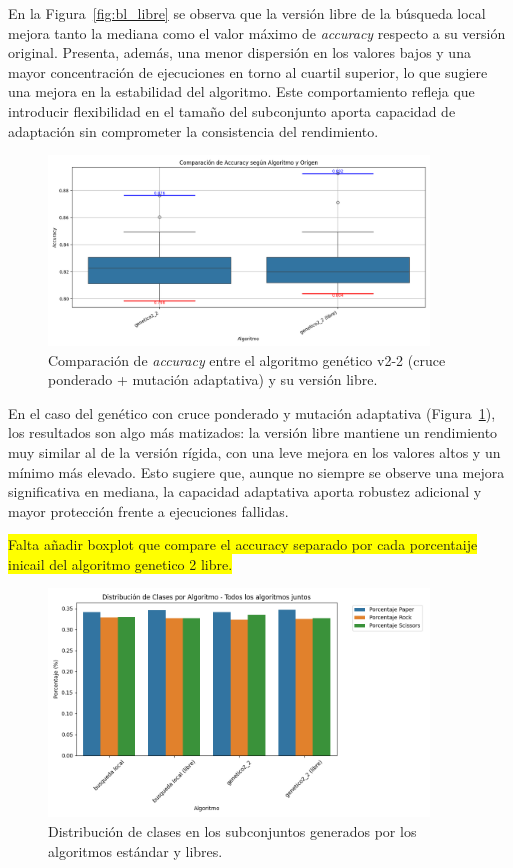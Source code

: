 En la Figura~\ref{fig:bl_libre} se observa que la versión libre de la búsqueda local mejora tanto la mediana 
como el valor máximo de \textit{accuracy} respecto a su versión original.
Presenta, además, una menor dispersión en los valores bajos y una mayor concentración de ejecuciones en torno al cuartil superior, 
lo que sugiere una mejora en la estabilidad del algoritmo.
Este comportamiento refleja que introducir flexibilidad en el tamaño del subconjunto aporta capacidad de adaptación sin comprometer la consistencia del rendimiento.


\begin{figure}[H]
    \centering
    \includegraphics[width=0.9\textwidth]{imagenes/evaluaciones/libres/comparacion_gen_v2}
    \caption{Comparación de \textit{accuracy} entre el algoritmo genético v2-2 (cruce ponderado + mutación adaptativa) y su versión libre.}
    \label{fig:gen_v2_libre}
\end{figure}

En el caso del genético con cruce ponderado y mutación adaptativa (Figura~\ref{fig:gen_v2_libre}), 
los resultados son algo más matizados: la versión libre mantiene un rendimiento muy similar al de la versión rígida, 
con una leve mejora en los valores altos y un mínimo más elevado.
Esto sugiere que, aunque no siempre se observe una mejora significativa en mediana, 
la capacidad adaptativa aporta robustez adicional y mayor protección frente a ejecuciones fallidas.


\colorbox{yellow}{Falta añadir boxplot que compare el accuracy separado por cada porcentaije inicail del algoritmo genetico 2 libre.}


\begin{figure}[H]
\centering
\includegraphics[width=0.9\textwidth]{imagenes/evaluaciones/libres/distribucion-clases}
\caption{Distribución de clases en los subconjuntos generados por los algoritmos estándar y libres.}
\label{fig:distribucion_libres}
\end{figure}

